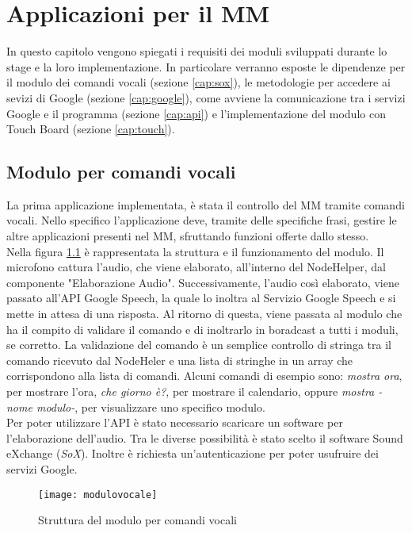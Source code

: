 \chapter{Applicazioni per il MM}\label{capitolo4}
In questo capitolo vengono spiegati i requisiti dei moduli sviluppati durante lo stage e la loro implementazione.
In particolare verranno esposte le dipendenze per il modulo dei comandi vocali (sezione \ref{cap:sox}), le metodologie
per accedere ai sevizi di Google (sezione \ref{cap:google}), come avviene la comunicazione tra i servizi Google e il programma (sezione \ref{cap:api})
e l'implementazione del modulo con Touch Board (sezione \ref{cap:touch}).

\section{Modulo per comandi vocali}\label{cap:voce}
La prima applicazione implementata, \`e
stata il controllo del MM tramite comandi vocali.
Nello specifico l'applicazione deve, tramite delle specifiche frasi,
gestire le altre applicazioni presenti nel MM, sfruttando funzioni offerte dallo stesso.\\
Nella figura \ref{fig:modulovocale} \`e rappresentata la struttura e il funzionamento del modulo.
Il microfono cattura l'audio, che viene elaborato, all'interno del NodeHelper, dal componente "Elaborazione Audio".
Successivamente, l'audio cos\`i elaborato, viene
passato all'API Google Speech, la quale lo inoltra al Servizio Google Speech e si mette in attesa di una risposta.
Al ritorno di questa, viene passata al modulo che ha il compito di validare il comando e di inoltrarlo in boradcast a tutti i moduli, se
corretto.
La validazione del comando è un semplice controllo di stringa tra il comando ricevuto dal NodeHeler e una lista di stringhe in un array che
corrispondono alla lista di comandi.
Alcuni comandi di esempio sono: \emph{mostra ora}, per mostrare l'ora, \emph{che giorno \`e?}, per mostrare
il calendario, oppure \emph{mostra -nome modulo-}, per visualizzare uno specifico modulo.\\
Per poter utilizzare l'API \`e stato necessario scaricare un software per l'elaborazione dell'audio.
Tra le diverse possibilità è stato scelto il software Sound eXchange (\emph{SoX}).
Inoltre \`e richiesta un'autenticazione per poter usufruire dei servizi Google.

\begin{figure}[H]
    \texttt{[image: modulovocale]}
    \caption{Struttura del modulo per comandi vocali}
    \label{fig:modulovocale}
\end{figure}

